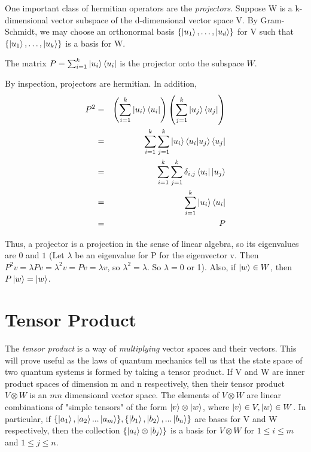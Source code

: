 One important class of hermitian operators are the \textit{projectors}. Suppose W is a k-dimensional vector subspace of the d-dimensional vector space V. By Gram-Schmidt, we may choose an orthonormal basis $\{\ket{u_1}, \hdots, \ket{u_d}\}$ for V such that $\{\ket{u_1}, \hdots, \ket{u_k}\}$ is a basis for W.  
\begin{definition}
The matrix $P=\sum_{i=1}^k \ket{u_i} \bra{u_i}$ is the projector onto the subspace $W$.
\end{definition}
By inspection, projectors are hermitian.  In addition,
\begin{eqnarray}
    P^2&=&\left(\sum_{i=1}^k \ket{u_i} \bra{u_i}\right)\left(\sum_{j=1}^k \ket{u_j} \bra{u_j}\right)\\
    &=&\sum_{i=1}^k \sum_{j=1}^k \ket{u_i} \braket{u_i|u_j} \bra{u_j}\\
    &=&\sum_{i=1}^k \sum_{j=1}^k\delta_{i,j}\bra{u_i}\ket{u_j}\\
    &=&\sum_{i=1}^k \ket{u_i} \bra{u_i}\\
    &=&P
    \end{eqnarray}

Thus, a projector is a projection in the sense of linear algebra, so its eigenvalues are $0$ and $1$ (Let $\lambda$ be an eigenvalue for P for the eigenvector v. Then $P^2 v = \lambda Pv=\lambda^2 v = Pv =\lambda v$, so $\lambda^2=\lambda$. So $\lambda=0$ or 1).  Also, if $\ket{w} \in W$, then $P\ket{w}=\ket{w}$.


\pagebreak
\section{Tensor Product}

The \textit{tensor product} is a way of {\emph{multiplying}} vector spaces and their vectors. This will prove useful as the laws of quantum mechanics tell us that the state space of two quantum systems is formed by taking a tensor product. If V and W are inner product spaces of dimension m and n respectively, then their tensor product $V \otimes W$ is an $mn$ dimensional vector space. The elements of $V \otimes W$ are linear combinations of "simple tensors" of the form $\ket{v} \otimes \ket{w}$, where $\ket{v} \in V, \ket{w} \in W$. In particular, if $\{\ket{a_1}, \ket{a_2}...\ket{a_m}\}, \{\ket{b_1},\ket{b_2}, ...\ket{b_n}\}$ are bases for V and W respectively, then the collection $\{\ket{a_i}\otimes\ket{b_j}\}$ is a basis for $V \otimes W$ for $1\leq i \leq m$ and $1 \leq j \leq n$.


